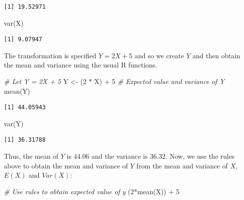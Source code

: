 \documentclass[
  oneside]{krantz}
\newenvironment{Shaded}{\begin{snugshade}}{\end{snugshade}}
\newcommand{\CommentTok}[1]{\textcolor[rgb]{0.56,0.35,0.01}{\textit{#1}}}
\newcommand{\DecValTok}[1]{\textcolor[rgb]{0.00,0.00,0.81}{#1}}
\newcommand{\FunctionTok}[1]{\textcolor[rgb]{0.00,0.00,0.00}{#1}}
\newcommand{\NormalTok}[1]{#1}
\newcommand{\OtherTok}[1]{\textcolor[rgb]{0.56,0.35,0.01}{#1}}
\newcommand{\SpecialCharTok}[1]{\textcolor[rgb]{0.00,0.00,0.00}{#1}}
\begin{document}
\begin{verbatim}
[1] 19.52971
\end{verbatim}

\begin{Shaded}
\begin{Highlighting}[]
\FunctionTok{var}\NormalTok{(X)}
\end{Highlighting}
\end{Shaded}

\begin{verbatim}
[1] 9.07947
\end{verbatim}

The transformation is specified \(Y = 2X + 5\) and so we create \(Y\) and then obtain the mean and variance using the usual R functions.

\begin{Shaded}
\begin{Highlighting}[]
\CommentTok{\# Let Y = 2X + 5}
\NormalTok{Y }\OtherTok{\textless{}{-}}\NormalTok{ (}\DecValTok{2} \SpecialCharTok{*}\NormalTok{ X) }\SpecialCharTok{+} \DecValTok{5}
\CommentTok{\# Expected value and variance of Y}
\FunctionTok{mean}\NormalTok{(Y)}
\end{Highlighting}
\end{Shaded}

\begin{verbatim}
[1] 44.05943
\end{verbatim}

\begin{Shaded}
\begin{Highlighting}[]
\FunctionTok{var}\NormalTok{(Y)}
\end{Highlighting}
\end{Shaded}

\begin{verbatim}
[1] 36.31788
\end{verbatim}

Thus, the mean of \(Y\) is 44.06 and the variance is 36.32. Now, we use the rules above to obtain the mean and variance of \(Y\) from the mean and variance of \(X\), \(E(X)\) and \(Var(X)\):

\begin{Shaded}
\begin{Highlighting}[]
\CommentTok{\# Use rules to obtain expected value of y}
\NormalTok{(}\DecValTok{2}\SpecialCharTok{*}\FunctionTok{mean}\NormalTok{(X)) }\SpecialCharTok{+} \DecValTok{5}
\end{Highlighting}
\end{Shaded}
\end{document}
